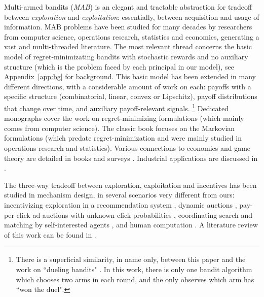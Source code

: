  Multi-armed bandits (\emph{MAB}) is an elegant and tractable abstraction for tradeoff between \emph{exploration} and \emph{exploitation}: essentially, between acquisition and usage of information. MAB problems have been studied for many decades by researchers from computer science, operations research, statistics and economics, generating a vast and multi-threaded literature.  The most relevant thread concerns the basic model of regret-minimizating bandits with stochastic rewards and no auxiliary structure (which is the problem faced by each principal in our model), see Appendix~\ref{app:bg} for background. This basic model has been extended in many different directions, with a considerable amount of work on each: \eg payoffs with a specific structure (\eg combinatorial, linear, convex or Lipschitz), payoff distributions that change over time, and auxiliary payoff-relevant signals.%
\footnote{There is a superficial similarity, in name only, between this paper and the work on ``dueling bandits" \citep[starting from][]{Yue-dueling12,Yue-dueling-icml09}.
In this work, there is only one bandit algorithm which chooses two arms in each round, and the only observes which arm has ``won the duel".}
Dedicated monographs \citep{Bubeck-survey12,slivkins-MABbook,LS19bandit-book} cover the work on regret-minimizing formulations (which mainly comes from computer science). The classic book
\citep{Gittins-book11} focuses on the Markovian formulations (which predate regret-minimization and were mainly studied in operations research and statistics).
Various connections to economics and game theory are detailed in
books \citep{CesaBL-book,slivkins-MABbook} and surveys \citep{Bergemann-survey06,Horner-survey16}. Industrial applications are discussed in \citep{DS-arxiv}.

The three-way tradeoff between exploration, exploitation and incentives has been studied in mechanism design, in several scenarios very different from ours:
incentivizing exploration in a recommendation system
    \citep[\eg][]{Che-13,Frazier-ec14,Kremer-JPE14,ICexploration-ec15,Bimpikis-exploration-ms17,Bahar-ec16,Jieming-unbiased18},
dynamic auctions
    \citep[\eg][]{AtheySegal-econometrica13,DynPivot-econometrica10,Kakade-pivot-or13},
pay-per-click ad auctions with unknown click probabilities
    \citep[\eg][]{MechMAB-ec09,DevanurK09,Transform-ec10-jacm},
coordinating search and matching by self-interested agents
    \citep{Bobby-Glen-ec16},
and human computation
    \citep[\eg][]{RepeatedPA-ec14,Ghosh-itcs13,Krause-www13}.
A literature review of this work can be found in
\citep[Ch. 11.6]{slivkins-MABbook}.

